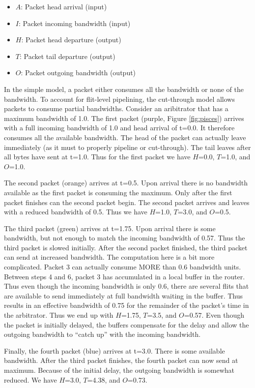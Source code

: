 \begin{itemize}
\item $A$: Packet head arrival (input)
\item $I$: Packet incoming bandwidth (input)
\item $H$: Packet head departure (output)
\item $T$: Packet tail departure (output)
\item $O$: Packet outgoing bandwidth (output)
\end{itemize}

In the simple model, a packet either consumes all the bandwidth or none of the bandwidth.
To account for flit-level pipelining, the cut-through model allows packets to consume partial bandwidths.
Consider an aribitrator that has a maximum bandwidth of 1.0.
The first packet (purple, Figure \ref{fig:pisces}) arrives with a full incoming bandwidth of 1.0 and head arrival of t=0.0.
It therefore consumes all the available bandwidth. 
The head of the packet can actually leave immediately (as it must to properly pipeline or cut-through).
The tail leaves after all bytes have sent at t=1.0.
Thus for the first packet we have $H$=0.0, $T$=1.0, and $O$=1.0.

The second packet (orange) arrives at t=0.5. 
Upon arrival there is no bandwidth available as the first packet is consuming the maximum.
Only after the first packet finishes can the second packet begin.
The second packet arrives and leaves with a reduced bandwidth of 0.5. 
Thus we have $H$=1.0, $T$=3.0, and $O$=0.5.

The third packet (green) arrives at t=1.75.
Upon arrival there is some bandwidth, but not enough to match the incoming bandwidth of 0.57.
Thus the third packet is slowed initially.
After the second packet finished, the third packet can send at increased bandwidth.
The computation here is a bit more complicated.
Packet 3 can actually consume MORE than 0.6 bandwidth units.
Between steps 4 and 6, packet 3 has accumulated in a local buffer in the router.
Thus even though the incoming bandwidth is only 0.6, there are several flits that are available to send immediately at full bandwidth waiting in the buffer.
Thus results in an effective bandwidth of 0.75 for the remainder of the packet's time in the arbitrator.
Thus we end up with $H$=1.75, $T$=3.5, and $O$=0.57.
Even though the packet is initially delayed, the buffers compensate for the delay and allow the outgoing bandwidth to ``catch up'' with the incoming bandwidth.

Finally, the fourth packet (blue) arrives at t=3.0. 
There is some available bandwidth. After the third packet finishes, the fourth packet can now send at maximum.
Because of the initial delay, the outgoing bandwidth is somewhat reduced.
We have $H$=3.0, $T$=4.38, and $O$=0.73.

